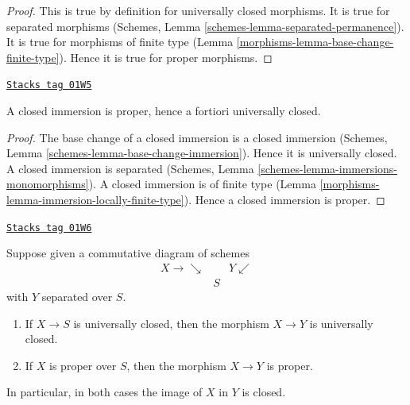 \begin{proof}

This is true by definition for universally closed morphisms.
It is true for separated morphisms
(Schemes, Lemma \ref{schemes-lemma-separated-permanence}).
It is true for morphisms of finite type
(Lemma \ref{morphisms-lemma-base-change-finite-type}).
Hence it is true for proper morphisms.
\end{proof}

\begin{lemma}
\label{morphisms-lemma-closed-immersion-proper}
\href{https://stacks.math.columbia.edu/tag/01W5}{\texttt{Stacks tag 01W5}}

A closed immersion is proper, hence a fortiori universally closed.
\end{lemma}

\begin{proof}

The base change of a closed immersion is a closed immersion
(Schemes, Lemma \ref{schemes-lemma-base-change-immersion}).
Hence it is universally closed.
A closed immersion is separated
(Schemes, Lemma \ref{schemes-lemma-immersions-monomorphisms}).
A closed immersion is of finite type
(Lemma \ref{morphisms-lemma-immersion-locally-finite-type}).
Hence a closed immersion is proper.
\end{proof}

\begin{lemma}
\label{morphisms-lemma-image-proper-scheme-closed}
\href{https://stacks.math.columbia.edu/tag/01W6}{\texttt{Stacks tag 01W6}}

Suppose given a commutative diagram of schemes
$$
\begin{array}{ccc}X \longrightarrow\searrow &  & Y \swarrow \\  & S & \end{array}
$$
with $Y$ separated over $S$.
\begin{enumerate}
\item If $X \to S$ is universally closed, then the morphism
$X \to Y$ is universally closed.
\item If $X$ is proper over $S$, then the morphism $X \to Y$ is proper.
\end{enumerate}
In particular, in both cases the image of $X$ in $Y$ is closed.
\end{lemma}

